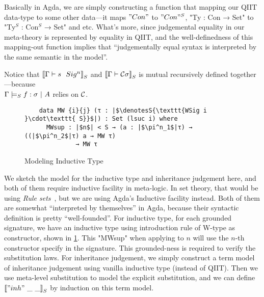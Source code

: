 Basically in Agda, we are simply constructing a function that mapping our QIIT data-type to some other data---it maps $"Con"$ to $"Con"^S$, "Ty : Con → Set" to "Ty$^S$ : Con$^S$ → Set" and etc. What's more, since judgemental equality in our meta-theory is represented by equality in QIIT, and the well-definedness of this mapping-out function implies that ``judgementally equal syntax is interpreted by the same semantic in the model''. 

Notice that $\denotesS{\goodSig{\Gamma}{s}{n}}$ and $\denotesS{\goodType{\Gamma}{\cC\sigma}{i}}$ is mutual recursively defined together---because \\ $\goodSealS{\Gamma}{f}{\sigma}{A}$ relies on $\cC$. 

\begin{figure}[!htb]
  \centering
\begin{minipage}{0.8\linewidth}
  \begin{verbatim}
    data MW {i}{j} (τ : |$\denotesS{\texttt{WSig i }\cdot\texttt{ S}}$|) : Set (lsuc i) where
      MWsup : |$n$| < S → (a : |$\pi^n_1$|τ) → ((|$\pi^n_2$|τ) a → MW τ) 
              → MW τ
      \end{verbatim}
\end{minipage}
\caption{Modeling Inductive Type}\label{fig:model-ind-type}
\end{figure}

We sketch the model for the inductive type and inheritance judgement here, and both of them require inductive facility in meta-logic. In set theory, that would be using \textit{Rule sets}~\cite{timany2017consistency,aczel1998relating}, but we are using Agda's Inductive facility instead. Both of them are somewhat ``interpreted by themselves'' in Agda, because their syntactic definition is pretty ``well-founded''. For inductive type, for each grounded signature, we have an inductive type using introduction rule of W-type as constructor, shown in \cref{fig:model-ind-type}. This "MWsup" when applying to $n$ will use the $n$-th constructor specify in the signature. This grounded-ness is required to verify the substitution laws. For inheritance judgement, we simply construct a term model of inheritance judgement using vanilla inductive type (instead of QIIT). Then we use meta-level substitution to model the explicit substitution, and we can define $\denotesS{"inh"~\_ ~\_}$ by induction on this term model. 



